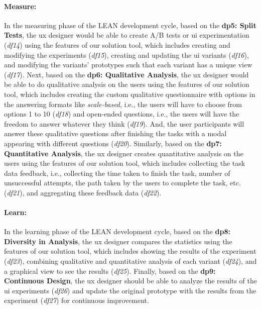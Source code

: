 \paragraph{Measure:}
In the measuring phase of the LEAN development cycle, based on the \textbf{\ac{dp}5: Split Tests}, the \ac{ux} designer would be able to create A/B tests or \ac{ui} experimentation (\textit{\ac{df}14}) using the features of our solution tool, which includes creating and modifying the experiments (\textit{\ac{df}15}), creating and updating the \ac{ui} variants (\textit{\ac{df}16}), and modifying the variants' prototypes such that each variant has a unique view (\textit{\ac{df}17}).
Next, based on the \textbf{\ac{dp}6: Qualitative Analysis}, the \ac{ux} designer would be able to do qualitative analysis on the users using the features of our solution tool, which includes creating the custom qualitative questionnaire with options in the answering formats like \textit{scale-based}, i.e., the users will have to choose from options 1 to 10 (\textit{\ac{df}18}) and open-ended questions, i.e., the users will have the freedom to answer whatever they think (\textit{\ac{df}19}). 
And, the user participants will answer these qualitative questions after finishing the tasks with a modal appearing with different questions (\textit{\ac{df}20}). 
Similarly, based on the \textbf{\ac{dp}7: Quantitative Analysis}, the \ac{ux} designer creates quantitative analysis on the users using the features of our solution tool, which includes collecting the task data feedback, i.e., collecting the time taken to finish the task, number of unsuccessful attempts, the path taken by the users to complete the task, etc. (\textit{\ac{df}21}), and aggregating these feedback data (\textit{\ac{df}22}). 

\paragraph{Learn:}
In the learning phase of the LEAN development cycle, based on the \textbf{\ac{dp}8: Diversity in Analysis}, the \ac{ux} designer compares the statistics using the features of our solution tool, which includes showing the results of the experiment (\textit{\ac{df}23}), combining qualitative and quantitative analysis of each variant (\textit{\ac{df}24}), and a graphical view to see the results (\textit{\ac{df}25}). 
Finally, based on the \textbf{\ac{dp}9: Continuous Design}, the \ac{ux} designer should be able to analyze the results of the \ac{ui} experiments (\textit{\ac{df}26}) and update the original prototype with the results from the experiment (\textit{\ac{df}27}) for continuous improvement.

